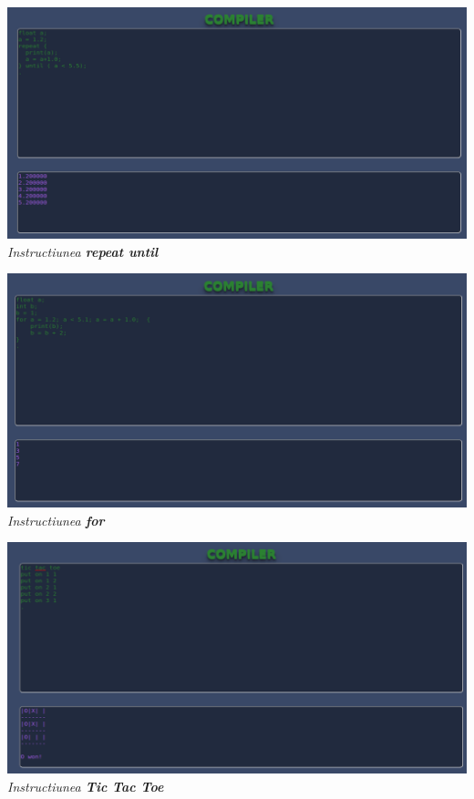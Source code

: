 \documentclass{article}
\begin{document}
\begin{center}
\includegraphics[scale = 0.4]{repeatUntil.png}\\
\textit{Instructiunea \textbf{repeat until}}
\end{center}

\begin{center}
\includegraphics[scale = 0.4]{for.png}\\
\textit{Instructiunea \textbf{for}}
\end{center}

\begin{center}
\includegraphics[scale = 0.4]{ticTacToe.png}\\
\textit{Instructiunea \textbf{Tic Tac Toe}}
\end{center}
\end{document}
